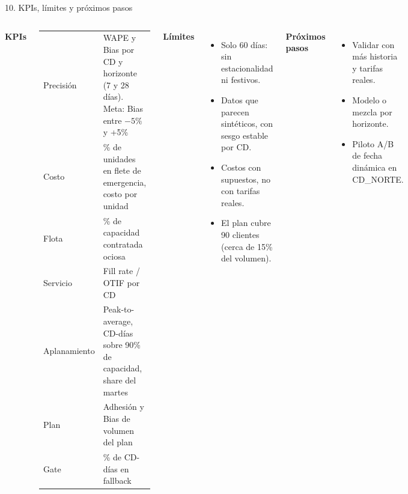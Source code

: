 \documentclass[aspectratio=169,10pt]{beamer}
\begin{document}
\begin{frame}{10. KPIs, límites y próximos pasos}
\begin{columns}[T]
\textbf{KPIs}
\begin{center}
\footnotesize
\begin{tabular}{p{2.0cm}p{5.2cm}}
\toprule
Precisión & WAPE y Bias por CD y horizonte (7 y 28 días). Meta: Bias entre $-5\%$ y +5\% \\
Costo & \% de unidades en flete de emergencia, costo por unidad \\
Flota & \% de capacidad contratada ociosa \\
Servicio & Fill rate / OTIF por CD \\
Aplanamiento & Peak-to-average, CD-días sobre 90\% de capacidad, share del martes \\
Plan & Adhesión y Bias de volumen del plan \\
Gate & \% de CD-días en fallback \\
\bottomrule
\end{tabular}
\end{center}
\textbf{Límites}
\begin{itemize}
\item Solo 60 días: sin estacionalidad ni festivos.
\item Datos que parecen sintéticos, con sesgo estable por CD.
\item Costos con supuestos, no con tarifas reales.
\item El plan cubre 90 clientes (cerca de 15\% del volumen).
\end{itemize}
\textbf{Próximos pasos}
\begin{itemize}
\item Validar con más historia y tarifas reales.
\item Modelo o mezcla por horizonte.
\item Piloto A/B de fecha dinámica en CD\_NORTE.
\end{itemize}
\end{columns}
\end{frame}
\end{document}
